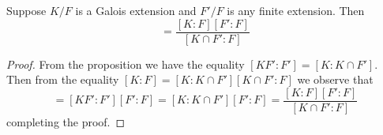 \documentclass[12pt, a4paper, oneside, openright, titlepage]{book}
\begin{document}
\begin{cor}
    Suppose $K/F$ is a Galois extension and $F'/F$ is any finite extension. Then \begin{equation*}
        [KF':F] = \frac{[K:F][F':F]}{[K\cap F':F]}
    \end{equation*}
\end{cor}
\begin{proof}
    From the proposition we have the equality $[KF':F'] = [K:K\cap F']$. Then from the equality $[K:F] = [K:K\cap F'][K\cap F':F]$ we observe that \begin{equation*}
        [KF':F] = [KF':F'][F':F] = [K:K\cap F'][F':F] = \frac{[K:F][F':F]}{[K\cap F':F]}
    \end{equation*}
    completing the proof.
\end{proof}
\end{document}
